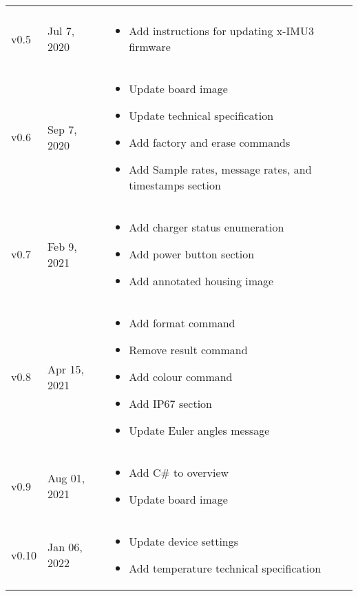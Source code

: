 \begin{longtable}{| >{\centering}p{} | p{} | >{\raggedright\arraybackslash}p{} |}
\begin{itemize}
        \end{itemize}\\
        v0.5 & Jul 7, 2020 &
        \begin{itemize}
            \item Add instructions for updating x-IMU3 firmware
        \end{itemize}\\
        v0.6 & Sep 7, 2020 &
        \begin{itemize}
            \item Update board image
            \item Update technical specification
            \item Add factory and erase commands
            \item Add Sample rates, message rates, and timestamps section
        \end{itemize}\\
        v0.7 & Feb 9, 2021 &
        \begin{itemize}
            \item Add charger status enumeration
            \item Add power button section
            \item Add annotated housing image
        \end{itemize}\\
        v0.8 & Apr 15, 2021 &
        \begin{itemize}
            \item Add format command
            \item Remove result command
            \item Add colour command
            \item Add \ac{IP67} section
            \item Update Euler angles message
        \end{itemize}\\
        v0.9 & Aug 01, 2021 &
        \begin{itemize}
            \item Add C\# to overview
            \item Update board image
        \end{itemize}\\
        v0.10 & Jan 06, 2022 &
        \begin{itemize}
            \item Update device settings
            \item Add temperature technical specification

\end{itemize}
\end{longtable}
